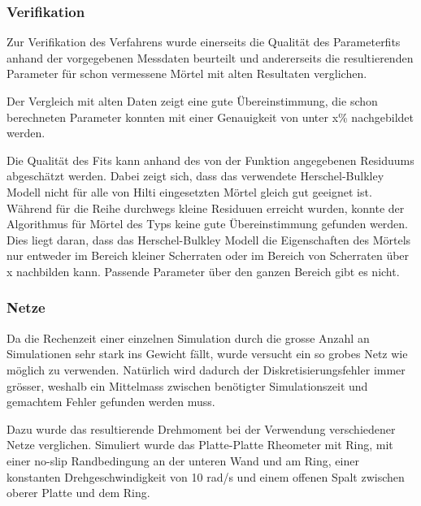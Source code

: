 \subsubsection{Verifikation}
Zur Verifikation des Verfahrens wurde einerseits die Qualität des Parameterfits anhand der vorgegebenen Messdaten beurteilt und andererseits die resultierenden Parameter für schon vermessene Mörtel mit alten Resultaten verglichen.

Der Vergleich mit alten Daten zeigt eine gute Übereinstimmung, die schon berechneten Parameter konnten mit einer Genauigkeit von unter x\%  nachgebildet werden.

Die Qualität des Fits kann anhand des von der Funktion  angegebenen Residuums abgeschätzt werden. Dabei zeigt sich, dass das verwendete Herschel-Bulkley Modell nicht für alle von Hilti eingesetzten Mörtel gleich gut geeignet ist. Während für die \hit{} Reihe durchwegs kleine Residuuen  erreicht wurden, konnte der Algorithmus für Mörtel des \re{} Typs keine gute Übereinstimmung gefunden werden.\\
Dies liegt daran, dass das Herschel-Bulkley Modell die Eigenschaften des Mörtels nur entweder im Bereich kleiner Scherraten  oder im Bereich von Scherraten über x nachbilden kann. Passende Parameter über den ganzen Bereich gibt es nicht.
%
\subsubsection{Netze}
Da die Rechenzeit einer einzelnen Simulation durch die grosse Anzahl an Simulationen sehr stark ins Gewicht fällt, wurde versucht ein so grobes Netz wie möglich zu verwenden. Natürlich wird dadurch der Diskretisierungsfehler immer grösser, weshalb ein Mittelmass zwischen benötigter Simulationszeit und gemachtem Fehler gefunden werden muss.

Dazu wurde das resultierende Drehmoment bei der Verwendung verschiedener Netze verglichen. Simuliert wurde das Platte-Platte Rheometer mit Ring, mit einer no-slip Randbedingung an der unteren Wand und am Ring, einer konstanten Drehgeschwindigkeit von 10 rad/s und einem offenen Spalt zwischen oberer Platte und dem Ring.

